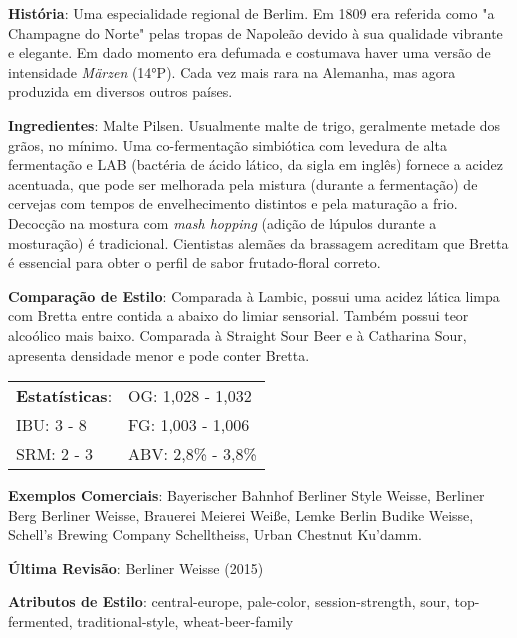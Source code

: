 \textbf{História}: Uma especialidade regional de Berlim. Em 1809 era referida como "a Champagne do Norte" pelas tropas de Napoleão devido à sua qualidade vibrante e elegante. Em dado momento era defumada e costumava haver uma versão de intensidade \textit{Märzen} (14°P). Cada vez mais rara na Alemanha, mas agora produzida em diversos outros países.

\textbf{Ingredientes}: Malte Pilsen. Usualmente malte de trigo, geralmente metade dos grãos, no mínimo. Uma co-fermentação simbiótica com levedura de alta fermentação e LAB (bactéria de ácido lático, da sigla em inglês) fornece a acidez acentuada, que pode ser melhorada pela mistura (durante a fermentação) de cervejas com tempos de envelhecimento distintos e pela maturação a frio. Decocção na mostura com \textit{mash hopping} (adição de lúpulos durante a mosturação) é tradicional. Cientistas alemães da brassagem acreditam que Bretta é essencial para obter o perfil de sabor frutado-floral correto.

\textbf{Comparação de Estilo}: Comparada à Lambic, possui uma acidez lática limpa com Bretta entre contida a abaixo do limiar sensorial. Também possui teor alcoólico mais baixo. Comparada à Straight Sour Beer e à Catharina Sour, apresenta densidade menor e pode conter Bretta.

\begin{tabular}{@{}p{35mm}p{35mm}@{}}
  \textbf{Estatísticas}: & OG: 1,028 - 1,032 \\
  IBU: 3 - 8  & FG: 1,003 - 1,006  \\
  SRM: 2 - 3  & ABV: 2,8\% - 3,8\%
\end{tabular}

\textbf{Exemplos Comerciais}: Bayerischer Bahnhof Berliner Style Weisse, Berliner Berg Berliner Weisse, Brauerei Meierei Weiße, Lemke Berlin Budike Weisse, Schell's Brewing Company Schelltheiss, Urban Chestnut Ku’damm.

\textbf{Última Revisão}: Berliner Weisse (2015)

\textbf{Atributos de Estilo}: central-europe, pale-color, session-strength, sour, top-fermented, traditional-style, wheat-beer-family

